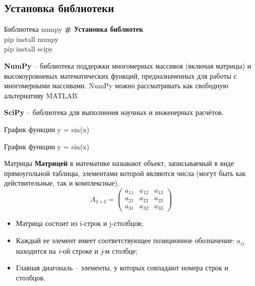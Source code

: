 \documentclass[12pt]{beamer}
\begin{document}
\subsection{Установка библиотеки}
\begin{frame}{Библиотека numpy}
\textbf{\# Установка библиотек} \\
\vspace{0.5cm}
pip install numpy \\
\vspace{0.2cm}
pip install scipy \\
\vspace{0.5cm}

\textbf{NumPy} -- библиотека поддержки многомерных массивов (включая матрицы) и высокоуровневых математических функций, предназначенных для работы с многомерными массивами. NumPy можно рассматривать как свободную альтернативу MATLAB.

\vspace{0.5cm}
\textbf{SciPy} -- библиотека для выполнения научных и инженерных расчётов. 

\end{frame}


\begin{frame}{График функции y = sin(x)}

\end{frame}


\begin{frame}{График функции y = sin(x)}

\end{frame}

\begin{frame}{Матрицы}
\textbf{Матрицей} в математике называют объект, записываемый в виде прямоугольной таблицы, элементами которой являются числа (могут быть как действительные, так и комплексные). \\
\vspace{0.5cm}
\[
  A_{3\times 3} = 
  \begin{pmatrix}
    a_{11} & a_{12} & a_{13}\\
    a_{21} & a_{22} & a_{23}\\
    a_{31} & a_{32} & a_{33}
  \end{pmatrix}
\]

\begin{itemize}
\item Матрица состоит из i-строк и j-столбцов;
\item Каждый ее элемент имеет соответствующее позиционное обозначение: $a_{ij}$ находится на \emph{i}-ой строке и \emph{j}-м столбце;
\item Главная диагональ -- элементы, у которых совпадают номера строк и столбцов.
\end{itemize}
\end{frame}
\end{document}
